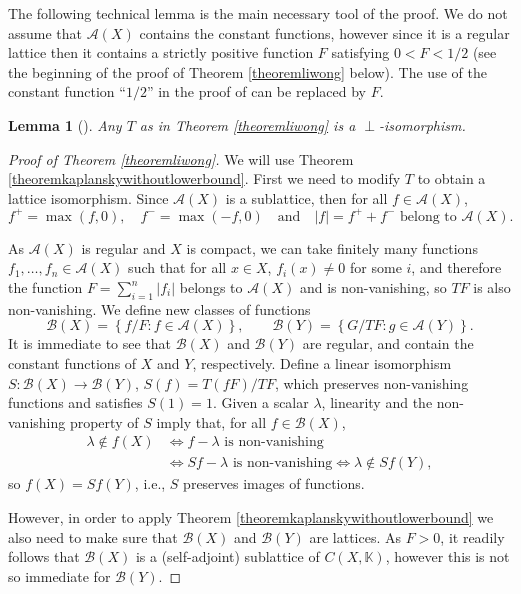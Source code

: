 \documentclass[letter,11pt]{amsart}
\theoremstyle{plain}		\newtheorem{theorem}[generalnumbering]{Theorem}
\theoremstyle{plain}		\newtheorem{corollary}[generalnumbering]{Corollary}
\theoremstyle{definition}		\newtheorem{definition}[generalnumbering]{Definition}
\theoremstyle{definition}		\newtheorem{example}[generalnumbering]{Example}
\theoremstyle{plain}		\newtheorem{proposition}[generalnumbering]{Proposition}
\theoremstyle{plain}		\newtheorem{lemma}[generalnumbering]{Lemma}
\theoremstyle{definition}
\begin{document}
The following technical lemma is the main necessary tool of the proof. We do not assume that $\mathcal{A}(X)$ contains the constant functions, however since it is a regular lattice then it contains a strictly positive function $F$ satisfying $0<F<1/2$ (see the beginning of the proof of Theorem \ref{theoremliwong} below). The use of the constant function ``$1/2$'' in the proof of \cite[Lemma 2.3]{MR3162258} can be replaced by $F$.

\begin{lemma}[{\cite[Lemma 2.3]{MR3162258}}]
	Any $T$ as in Theorem \ref{theoremliwong} is a $\perp$-isomorphism.
\end{lemma}

\begin{proof}[Proof of Theorem \ref{theoremliwong}]
	We will use Theorem \ref{theoremkaplanskywithoutlowerbound}. First we need to modify $T$ to obtain a lattice isomorphism. Since $\mathcal{A}(X)$ is a sublattice, then for all $f\in\mathcal{A}(X)$,
	\[f^+=\max(f,0),\quad f^-=\max(-f,0)\quad\text{and}\quad|f|=f^++f^-\text{ belong to }\mathcal{A}(X).\]
	
	As $\mathcal{A}(X)$ is regular and $X$ is compact, we can take finitely many functions $f_1,\ldots,f_n\in\mathcal{A}(X)$ such that for all $x\in X$, $f_i(x)\neq 0$ for some $i$, and therefore the function $F=\sum_{i=1}^n|f_i|$ belongs to $\mathcal{A}(X)$ and is non-vanishing, so $TF$ is also non-vanishing. We define new classes of functions
	\[\mathcal{B}(X)=\left\{f/F:f\in\mathcal{A}(X)\right\},\qquad\mathcal{B}(Y)=\left\{G/TF:g\in\mathcal{A}(Y)\right\}.\]
	It is immediate to see that $\mathcal{B}(X)$ and $\mathcal{B}(Y)$ are regular, and contain the constant functions of $X$ and $Y$, respectively. Define a linear isomorphism $S\colon \mathcal{B}(X)\to\mathcal{B}(Y)$, $S(f)=T(fF)/TF$, which preserves non-vanishing functions and satisfies $S(1)=1$. Given a scalar $\lambda$, linearity and the non-vanishing property of $S$ imply that, for all $f\in\mathcal{B}(X)$,
	\begin{align*}
	\lambda\not\in f(X)&\iff f-\lambda\text{ is non-vanishing}\\
	&\iff Sf-\lambda\text{ is non-vanishing}\iff \lambda\not\in Sf(Y),
	\end{align*}
	so $f(X)=Sf(Y)$, i.e., $S$ preserves images of functions.
	
	However, in order to apply Theorem \ref{theoremkaplanskywithoutlowerbound} we also need to make sure that $\mathcal{B}(X)$ and $\mathcal{B}(Y)$ are lattices. As $F>0$, it readily follows that $\mathcal{B}(X)$ is a (self-adjoint) sublattice of $C(X,\mathbb{K})$, however this is not so immediate for $\mathcal{B}(Y)$.
	

\end{proof}
\end{document}
